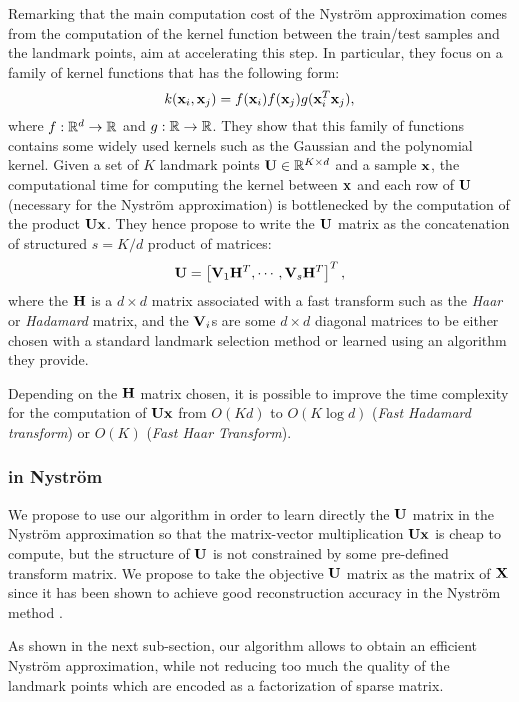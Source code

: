Remarking that the main computation cost of the Nyström approximation comes from the computation of the kernel function between the train/test samples and the landmark points, \cite{si2016computationally} aim at accelerating this step. In particular, they focus on a family of kernel functions that has the following form:
%
\begin{equation}
 k({\mathbf{x}}_i, {\mathbf{x}}_j) = f({\mathbf{x}}_i) f({\mathbf{x}}_j) g({\mathbf{x}}_i^T{\mathbf{x}}_j),
\end{equation}
%
where $f: \mathbb{R}^d \rightarrow \mathbb{R}$ and $g: \mathbb{R} \rightarrow \mathbb{R}$. They show that this family of functions contains some widely used kernels such as the Gaussian and the polynomial kernel. Given a set of $K$ landmark points ${\mathbf{U}} \in \mathbb{R}^{K \times d}$ and a sample ${\mathbf{x}}$, the computational time for computing the kernel between ${\mathbf{x}}$ and each row of ${\mathbf{U}}$ (necessary for the Nyström approximation) is bottlenecked by the computation of the product ${\mathbf{U}}{\mathbf{x}}$. They hence propose to write the ${\mathbf{U}}$ matrix as the concatenation of structured $s = K / d$ product of matrices:
%
\begin{equation}
 {\mathbf{U}} = \left[ {\mathbf{V}}_1 {\mathbf{H}}^T, \cdots, {\mathbf{V}}_s{\mathbf{H}}^T  \right]^T,
\end{equation}
%
where the ${\mathbf{H}}$ is a $d \times d$ matrix associated with a fast transform such as the \textit{Haar} or \textit{Hadamard} matrix, and the ${\mathbf{V}}_i$s are some $d \times d$ diagonal matrices to be either chosen with a standard landmark selection method or learned using an algorithm they provide.

Depending on the ${\mathbf{H}}$ matrix chosen, it is possible to improve the time complexity for the computation of ${\mathbf{U}}{\mathbf{x}}$ from $O(Kd)$ to $O(K \log{d})$ (\textit{Fast Hadamard transform}) or $O(K)$ (\textit{Fast Haar Transform}).

\subsubsection{\qkmeans in Nyström}

We propose to use our \qkmeans algorithm in order to learn directly the ${\mathbf{U}}$ matrix in the Nyström approximation so that the matrix-vector multiplication ${\mathbf{U}} {\mathbf{x}}$ is cheap to compute, but the structure of ${\mathbf{U}}$ is not constrained by some pre-defined transform matrix. We propose to take the objective ${\mathbf{U}}$ matrix as the \kmeans matrix of ${\mathbf{X}}$ since it has been shown to achieve good reconstruction accuracy in the Nyström method \cite{kumar2012sampling}.

As shown in the next sub-section, our algorithm allows to obtain an efficient Nyström approximation, while not reducing too much the quality of the \kmeans landmark points which are encoded as a factorization of sparse matrix. 

